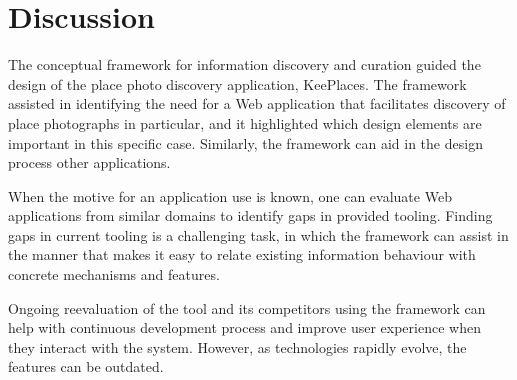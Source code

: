{\section{Discussion}
The conceptual framework for information discovery and curation guided the design of the place photo discovery application, KeePlaces. The framework assisted in identifying the need for a Web application that facilitates discovery of place photographs in particular, and it highlighted which design elements are important in this specific case. Similarly, the framework can aid in the design process other applications. 

When the motive for an application use is known, one can evaluate Web applications from similar domains to identify gaps in provided tooling. Finding gaps in current tooling is a challenging task, in which the framework can assist in the manner that makes it easy to relate existing information behaviour with concrete mechanisms and features.  

Ongoing reevaluation of the tool and its competitors using the framework can help with continuous development process and improve user experience when they interact with the system. However, as technologies rapidly evolve, the features can be outdated.
} %




